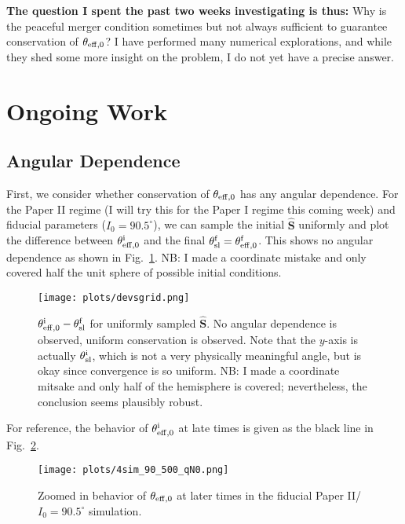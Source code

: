 \documentclass[11pt,
        usenames, %
        dvipsnames %
    ]{article}
\newcommand*{\bm}[1]{\boldsymbol{\mathbf{#1}}}
\newcommand*{\uv}[1]{\hat{\bm{#1}}}
\begin{document}
\textbf{The question I spent the past two weeks investigating is thus:} Why is
the peaceful merger condition sometimes but not always sufficient to guarantee
conservation of $\theta_{\rm eff, 0}$? I have performed many numerical
explorations, and while they shed some more insight on the problem, I do not yet
have a precise answer.

\section{Ongoing Work}

\subsection{Angular Dependence}

First, we consider whether conservation of $\theta_{\rm eff, 0}$ has any
angular dependence. For the Paper II regime (I will try this for the Paper I
regime this coming week) and fiducial parameters ($I_0 = 90.5^\circ$), we can
sample the initial $\uv{S}$ uniformly and plot the difference between
$\theta_{\rm eff, 0}^{\rm i}$ and the final $\theta_{\rm sl}^{\rm f} =
\theta_{\rm eff, 0}^{\rm f}$. This shows no angular dependence as shown in
Fig.~\ref{fig:devsgrid}. NB\@: I made a coordinate mistake and only covered half
the unit sphere of possible initial conditions.
\begin{figure}
    \centering
    \texttt{[image: plots/devsgrid.png]}
    \caption{$\theta_{\rm eff, 0}^{\rm i} - \theta_{\rm sl}^{\rm f}$ for
    uniformly sampled $\uv{S}$. No angular dependence is observed,
    uniform conservation is observed. Note that the $y$-axis is actually
    $\theta_{\rm sl}^{\rm i}$, which is not a very physically meaningful angle,
    but is okay since convergence is so uniform. NB\@: I made a coordinate mitsake
    and only half of the hemisphere is covered; nevertheless, the conclusion
    seems plausibly robust.}\label{fig:devsgrid}
\end{figure}

For reference, the behavior of $\theta_{\rm eff, 0}^{\rm i}$ at late times is
given as the black line in Fig.~\ref{fig:905qN0}.
\begin{figure}
    \centering
    \texttt{[image: plots/4sim\_90\_500\_qN0.png]}
    \caption{Zoomed in behavior of $\theta_{\rm eff, 0}$ at later times in the
    fiducial Paper II/$I_0 = 90.5^\circ$ simulation.}\label{fig:905qN0}
\end{figure}
\end{document}
